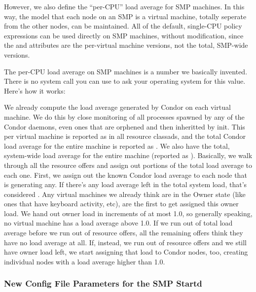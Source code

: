 However, we also define the ``per-CPU'' load average for SMP machines.
In this way, the model that each node on an SMP is a virtual machine,
totally seperate from the other nodes, can be maintained.
All of the default, single-CPU policy expressions can be used directly
on SMP machines, without modification, since the  and
 attributes are the per-virtual machine versions,
not the total, SMP-wide versions.

The per-CPU load average on SMP machines is a number we basically
invented. 
There is no system call you can use to ask your operating system for
this value.
Here's how it works:

We already compute the load average generated by Condor on each
virtual machine.
We do this by close monitoring of all processes spawned by any of the
Condor daemons, even ones that are orphened and then inheritted by
init. 
This  per virtual machine is reported as
 in all resource classads, and the total Condor
load average for the entire machine is reported as
. 
We also have the total, system-wide load average for the entire
machine (reported as ).
Basically, we walk through all the resource offers and assign out
portions of the total load average to each one. 
First, we assign out the known Condor load average to each node that
is generating any.  
If there's any load average left in the total system load, that's
considered .
Any virtual machines we already think are in the Owner state (like
ones that have keyboard activity, etc), are the first to get assigned
this owner load.
We hand out owner load in increments of at most 1.0, so generally
speaking, no virtual machine has a load average above 1.0.
If we run out of total load average before we run out of resource
offers, all the remaining offers think they have no load average at
all.
If, instead, we run out of resource offers and we still have owner
load left, we start assigning that load to Condor nodes, too, creating
individual nodes with a load average higher than 1.0.

\subsubsection{New Config File Parameters for the SMP Startd}
\label{sec:New-SMP-Parameters}

